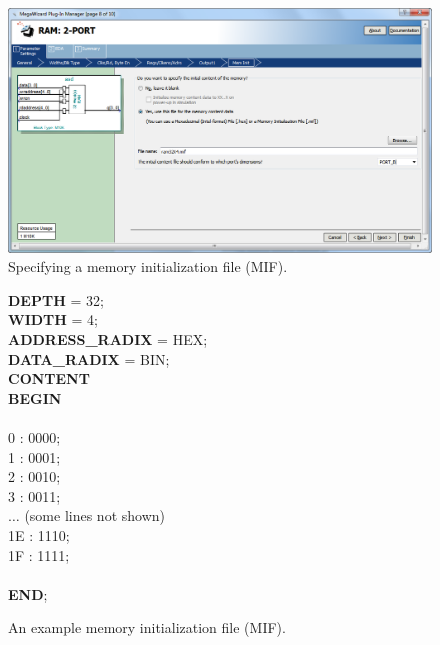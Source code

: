 \documentclass[epsfig,10pt,fullpage]{article}
\newcommand{\CommonDocsPath}{../../../common/docs}
\begin{document}
\begin{figure}[H]
	\begin{center}
		\includegraphics[scale=0.50]{figures/figure6.png}
	\end{center}
	\caption{Specifying a memory initialization file (MIF).}
	\label{fig:fig6}
\end{figure}

\begin{figure}[H]
\begin{center}
\begin{minipage}[t]{12.5 cm}
\begin{tabbing}
{\bf DEPTH} = 32;\\
{\bf WIDTH} = 4;\\
{\bf ADDRESS\_RADIX} = HEX;\\
{\bf DATA\_RADIX} = BIN;\\
{\bf CONTENT}\\
{\bf BEGIN}\\
\\
0 : 0000;\\
1 : 0001;\\
2 : 0010;\\
3 : 0011;\\
$\ldots$ (some lines not shown)\\
1E : 1110;\\
1F : 1111;\\
\\
{\bf END};\\
\end{tabbing}
\end{minipage}
\end{center}
\caption{An example memory initialization file (MIF).}
\label{fig:mif}
\end{figure}



\end{document}
